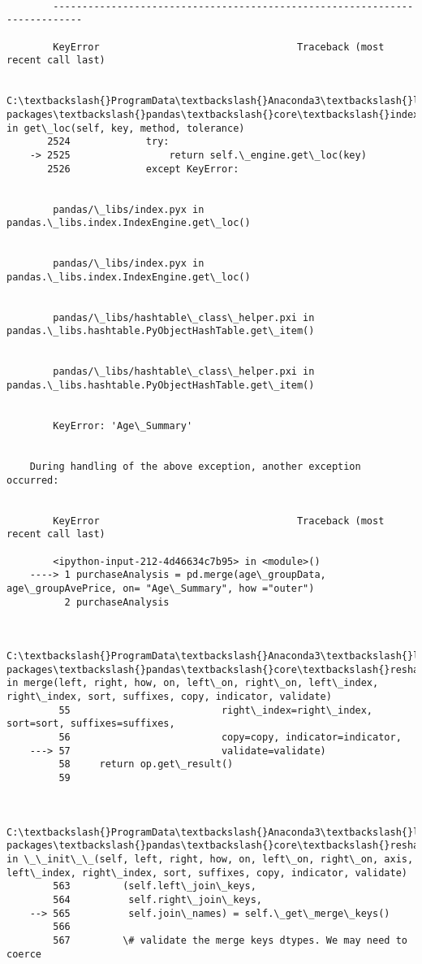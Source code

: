 \documentclass[11pt]{article}
\begin{document}
    \begin{Verbatim}[commandchars=\\\{\}]

        ---------------------------------------------------------------------------

        KeyError                                  Traceback (most recent call last)

        C:\textbackslash{}ProgramData\textbackslash{}Anaconda3\textbackslash{}lib\textbackslash{}site-packages\textbackslash{}pandas\textbackslash{}core\textbackslash{}indexes\textbackslash{}base.py in get\_loc(self, key, method, tolerance)
       2524             try:
    -> 2525                 return self.\_engine.get\_loc(key)
       2526             except KeyError:
    

        pandas/\_libs/index.pyx in pandas.\_libs.index.IndexEngine.get\_loc()
    

        pandas/\_libs/index.pyx in pandas.\_libs.index.IndexEngine.get\_loc()
    

        pandas/\_libs/hashtable\_class\_helper.pxi in pandas.\_libs.hashtable.PyObjectHashTable.get\_item()
    

        pandas/\_libs/hashtable\_class\_helper.pxi in pandas.\_libs.hashtable.PyObjectHashTable.get\_item()
    

        KeyError: 'Age\_Summary'

        
    During handling of the above exception, another exception occurred:
    

        KeyError                                  Traceback (most recent call last)

        <ipython-input-212-4d46634c7b95> in <module>()
    ----> 1 purchaseAnalysis = pd.merge(age\_groupData, age\_groupAvePrice, on= "Age\_Summary", how ="outer")
          2 purchaseAnalysis
    

        C:\textbackslash{}ProgramData\textbackslash{}Anaconda3\textbackslash{}lib\textbackslash{}site-packages\textbackslash{}pandas\textbackslash{}core\textbackslash{}reshape\textbackslash{}merge.py in merge(left, right, how, on, left\_on, right\_on, left\_index, right\_index, sort, suffixes, copy, indicator, validate)
         55                          right\_index=right\_index, sort=sort, suffixes=suffixes,
         56                          copy=copy, indicator=indicator,
    ---> 57                          validate=validate)
         58     return op.get\_result()
         59 
    

        C:\textbackslash{}ProgramData\textbackslash{}Anaconda3\textbackslash{}lib\textbackslash{}site-packages\textbackslash{}pandas\textbackslash{}core\textbackslash{}reshape\textbackslash{}merge.py in \_\_init\_\_(self, left, right, how, on, left\_on, right\_on, axis, left\_index, right\_index, sort, suffixes, copy, indicator, validate)
        563         (self.left\_join\_keys,
        564          self.right\_join\_keys,
    --> 565          self.join\_names) = self.\_get\_merge\_keys()
        566 
        567         \# validate the merge keys dtypes. We may need to coerce
    


\end{Verbatim}
\end{document}
